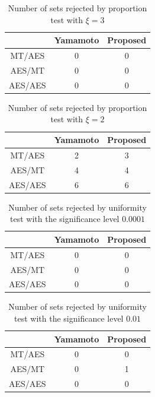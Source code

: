 \documentclass[dvipdfmx,english]{ampmt} %
\begin{document}
\begin{table}[htb]
  \centering
  \caption{Number of sets rejected by proportion test with $\xi=3$}
  \begin{tabular}{ccc} \hline
              & Yamamoto \cite{yamamoto2016highly}  & Proposed \\ \hline 
    MT/AES    & 0         & 0        \\
    AES/MT    & 0         & 0        \\
    AES/AES   & 0         & 0        \\ \hline 
  \end{tabular}
  \label{tab:proportion_1}
\end{table}
\begin{table}[htb]
  \centering
  \caption{Number of sets rejected by proportion test with $\xi=2$}
  \begin{tabular}{ccc} \hline
              & Yamamoto \cite{yamamoto2016highly} & Proposed \\ \hline 
    MT/AES    & 2         & 3        \\
    AES/MT    & 4         & 4        \\
    AES/AES   & 6         & 6        \\ \hline 
  \end{tabular}
  \label{tab:proportion_2}
\end{table}
\begin{table}[t]
  \centering
  \caption{Number of sets rejected by uniformity test with the significance level $0.0001$}
  \begin{tabular}{ccc} \hline
              & Yamamoto \cite{yamamoto2016highly} & Proposed \\ \hline 
    MT/AES    & 0         & 0        \\
    AES/MT    & 0         & 0        \\
    AES/AES   & 0         & 0        \\ \hline 
  \end{tabular}
  \label{tab:uniformity_1}
\end{table}
\begin{table}[t]
  \centering
  \caption{Number of sets rejected by uniformity test with the significance level $0.01$}
  \begin{tabular}{ccc} \hline
              & Yamamoto \cite{yamamoto2016highly} & Proposed \\ \hline 
    MT/AES    & 0         & 0        \\
    AES/MT    & 0         & 1        \\
    AES/AES   & 0         & 0        \\ \hline 
  \end{tabular}
  \label{tab:uniformity_2}
\end{table}
\end{document}

